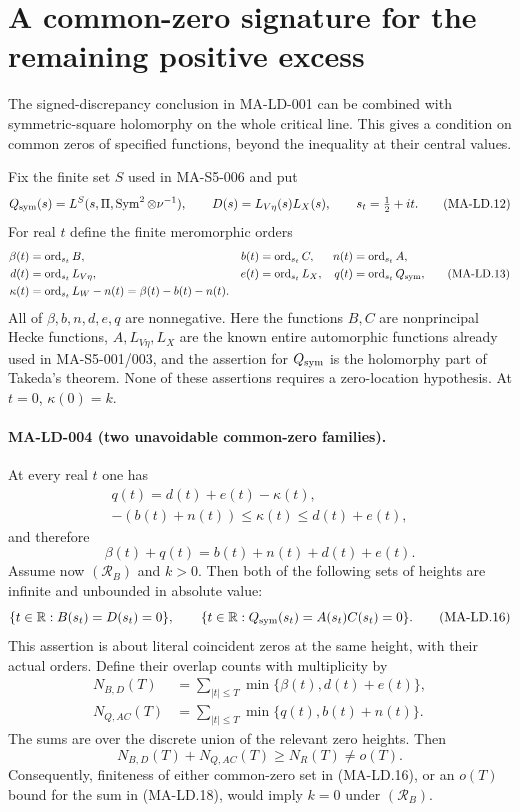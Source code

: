 \section{A common-zero signature for the remaining positive excess}
\label{sec:booker-rankin}

The signed-discrepancy conclusion in MA-LD-001 can be combined
with symmetric-square holomorphy on the whole critical line.
This gives a condition on common zeros of specified functions,
beyond the inequality at their central values.

Fix the finite set $S$ used in MA-S5-006 and put
\[
 Q_{\rm sym}(s)=L^S(s,\Pi,\operatorname{Sym}^2\otimes\nu^{-1}),
 \qquad D(s)=L_{V\eta}(s)L_X(s),\qquad s_t=\tfrac12+it.
 \tag{MA-LD.12}
\]
For real $t$ define the finite meromorphic orders
\[
 \begin{aligned}
 \beta(t)&=\operatorname{ord}_{s_t}B,&
 b(t)&=\operatorname{ord}_{s_t}C,&
 n(t)&=\operatorname{ord}_{s_t}A,\\
 d(t)&=\operatorname{ord}_{s_t}L_{V\eta},&
 e(t)&=\operatorname{ord}_{s_t}L_X,&
 q(t)&=\operatorname{ord}_{s_t}Q_{\rm sym},\\
 \kappa(t)&=\operatorname{ord}_{s_t}L_W-n(t)
             =\beta(t)-b(t)-n(t).
 \end{aligned}
 \tag{MA-LD.13}
\]
All of $\beta,b,n,d,e,q$ are nonnegative. Here the functions
$B,C$ are nonprincipal Hecke functions, $A,L_{V\eta},L_X$
are the known entire automorphic functions already used in
MA-S5-001/003, and the assertion for $Q_{\rm sym}$ is the
holomorphy part of Takeda's theorem. None of these assertions
requires a zero-location hypothesis. At $t=0$,
$\kappa(0)=k$.

\paragraph{MA-LD-004 (two unavoidable common-zero families).}
At every real $t$ one has
\[
 \begin{gathered}
 \boxed{q(t)=d(t)+e(t)-\kappa(t)},\\
 -(b(t)+n(t))\le\kappa(t)\le d(t)+e(t),
 \end{gathered}
 \tag{MA-LD.14}
\]
and therefore
\[
                 \beta(t)+q(t)=b(t)+n(t)+d(t)+e(t).
 \tag{MA-LD.15}
\]
Assume now $(\mathcal R_B)$ and $k>0$. Then both of the following
sets of heights are infinite and unbounded in absolute value:
\[
 \{t\in\mathbb R:B(s_t)=D(s_t)=0\},\qquad
 \{t\in\mathbb R:Q_{\rm sym}(s_t)=A(s_t)C(s_t)=0\}.
 \tag{MA-LD.16}
\]
This assertion is about literal coincident zeros at the same
height, with their actual orders. Define their overlap counts
with multiplicity by
\[
 \begin{aligned}
 N_{B,D}(T)&=\sum_{|t|\le T}\min\{\beta(t),d(t)+e(t)\},\\
 N_{Q,AC}(T)&=\sum_{|t|\le T}\min\{q(t),b(t)+n(t)\}.
 \end{aligned}
 \tag{MA-LD.17}
\]
The sums are over the discrete union of the relevant zero
heights. Then
\[
       N_{B,D}(T)+N_{Q,AC}(T)\ge N_R(T)\ne o(T).
 \tag{MA-LD.18}
\]
Consequently, finiteness of either common-zero set in
(MA-LD.16), or an $o(T)$ bound for the sum in (MA-LD.18),
would imply $k=0$ under $(\mathcal R_B)$.

